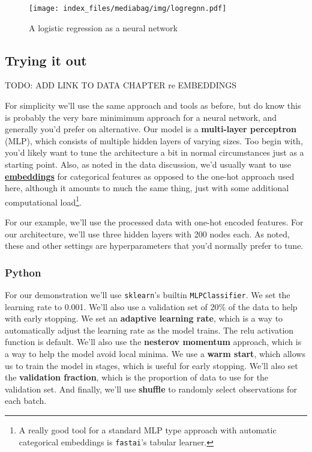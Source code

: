 \documentclass[
  letterpaper,
]{krantz}
\begin{document}
\label{logistic-nn-graph}

\begin{figure}[H]

{\centering \texttt{[image: index\_files/mediabag/img/logregnn.pdf]}

}

\caption{A logistic regression as a neural network}

\end{figure}%

\subsection{Trying it out}\label{trying-it-out}

TODO: ADD LINK TO DATA CHAPTER re EMBEDDINGS

For simplicity we'll use the same approach and tools as before, but do
know this is probably the very bare minimimum approach for a neural
network, and generally you'd prefer on alternative. Our model is a
\textbf{multi-layer perceptron} (MLP), which consists of multiple hidden
layers of varying sizes. Too begin with, you'd likely want to tune the
architecture a bit in normal circumstances just as a starting point.
Also, as noted in the data discussion, we'd usually want to use
\hyperref[data-cat]{\textbf{embeddings}} for categorical features as
opposed to the one-hot approach used here, although it amounts to much
the same thing, just with some additional computational load\footnote{A
  really good tool for a standard MLP type approach with automatic
  categorical embeddings is \texttt{fastai}'s tabular learner.}.

For our example, we'll use the processed data with one-hot encoded
features. For our architecture, we'll use three hidden layers with 200
nodes each. As noted, these and other settings are hyperparameters that
you'd normally prefer to tune.

\subsubsection{Python}

For our demonstration we'll use \texttt{sklearn}'s builtin
\texttt{MLPClassifier}. We set the learning rate to 0.001. We'll also
use a validation set of 20\% of the data to help with early stopping. We
set an \textbf{adaptive learning rate}, which is a way to automatically
adjust the learning rate as the model trains. The relu activation
function is default. We'll also use the \textbf{nesterov momentum}
approach, which is a way to help the model avoid local minima. We use a
\textbf{warm start}, which allows us to train the model in stages, which
is useful for early stopping. We'll also set the \textbf{validation
fraction}, which is the proportion of data to use for the validation
set. And finally, we'll use \textbf{shuffle} to randomly select
observations for each batch.
\end{document}
